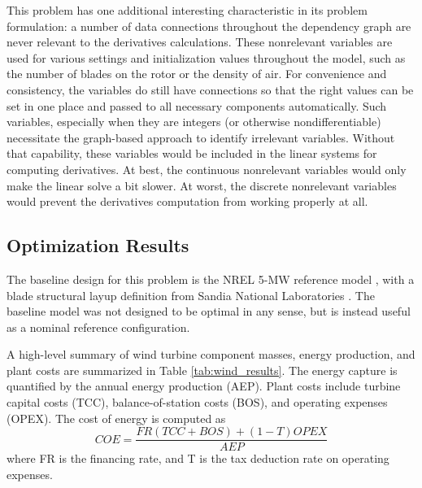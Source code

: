 \documentclass[]{aiaa-tc} %
\begin{document}
    This problem has one additional interesting characteristic in its
    problem formulation: a number of data connections throughout the dependency
    graph are never relevant to the derivatives calculations. These nonrelevant
    variables are used for various settings and initialization values throughout the
    model, such as the number of blades on the rotor or the density of air. For convenience 
    and consistency, the variables do still have connections so that the right values can 
    be set in one place and passed to all necessary components automatically. 
    Such variables, especially when they are integers (or otherwise nondifferentiable)
    necessitate the graph-based approach to identify irrelevant variables. Without that capability, these
    variables would be included in the linear systems for computing derivatives. At best, 
    the continuous nonrelevant variables would only make the linear solve a bit slower. 
    At worst, the discrete nonrelevant variables would prevent the derivatives computation from working properly at all. 


    \subsection{Optimization Results}

    The baseline design for this problem is the NREL 5-MW reference model \cite{Jonkman2009}, with a blade structural layup definition from Sandia National Laboratories \cite{Resor2013}.  The baseline model was not designed to be optimal in any sense, but is instead useful as a nominal reference configuration.  

    A high-level summary of wind turbine component masses, energy production, and plant costs are summarized in Table \ref{tab:wind_results}.  The energy capture is quantified by the annual energy production (AEP).  Plant costs include turbine capital costs (TCC), balance-of-station costs (BOS), and operating expenses (OPEX).  The cost of energy is computed as
    \begin{equation}
    COE = \frac {FR (TCC + BOS) + (1-T) OPEX} {AEP}
    \end{equation}
    where FR is the financing rate, and T is the tax deduction rate on operating expenses.
\end{document}

